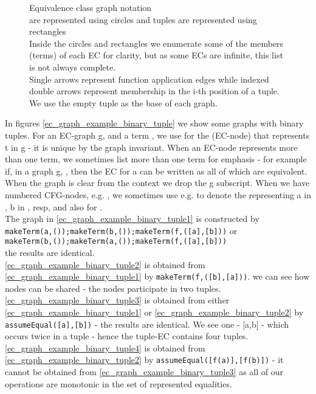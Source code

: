 \begin{figure}
\caption{Equivalence class graph notation\\
\GTs{} are represented using circles and \GT{} tuples are represented using rectangles\\
Inside the circles and rectangles we enumerate some of the members (terms) of each EC for clarity,
but as some ECs are infinite, this list is not always complete.\\
Single arrows represent function application edges while indexed double arrows 
represent membership in the i-th position of a tuple.\\
We use the empty tuple as the base of each graph.
}
\label{fig_ec_graph_legend}
\end{figure}

\noindent 
In figures \ref{ec_graph_example_binary_tuple} we show some graphs with binary tuples.
For an EC-graph g, and a term , we use  for the \GT{} (EC-node) that represents t in g - it is unique by the graph invariant. When an EC-node represents more than one term, we sometimes list more than one term for emphasis - for example if, in a graph g, , then the EC for a can be written as  all of which are equivalent. When the graph is clear from the context we drop the g subscript. When we have numbered CFG-nodes, e.g. , we sometimes use e.g.  to denote the \GT{} representing a in , b in , resp, and also  for .\\
The graph in \ref{ec_graph_example_binary_tuple1} is constructed by\\
\lstinline|makeTerm(a,());makeTerm(b,());makeTerm(f,([a],[b]))| or \\
\lstinline|makeTerm(b,());makeTerm(a,());makeTerm(f,([a],[b]))| \\
the results are identical.\\
\ref{ec_graph_example_binary_tuple2} is obtained from \ref{ec_graph_example_binary_tuple1} by \lstinline|makeTerm(f,([b],[a]))|.
we can see how \GT{} nodes can be shared - the nodes \m{[a],[b]} participate in two tuples. \\
\ref{ec_graph_example_binary_tuple3} is obtained from either \ref{ec_graph_example_binary_tuple1} or \ref{ec_graph_example_binary_tuple2} by \lstinline|assumeEqual([a],[b])| - the results are identical.
We see one \GT{} - [a,b] - which occurs twice in a tuple - hence the tuple-EC contains four tuples. 
\ref{ec_graph_example_binary_tuple4} is obtained from \ref{ec_graph_example_binary_tuple2} by \lstinline|assumeEqual([f(a)],[f(b)])| - it cannot be obtained from \ref{ec_graph_example_binary_tuple3} as all of our operations are monotonic in the set of represented equalities.

